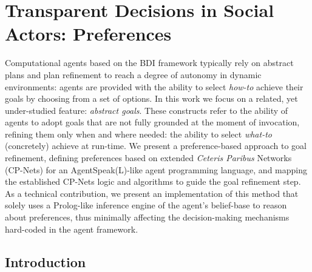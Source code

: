 \chapter{Transparent Decisions in Social Actors: Preferences}
\label{ch:preferences}
Computational agents based on the BDI framework typically rely on abstract plans and plan refinement to reach a degree of autonomy in dynamic environments: agents are provided with the 
ability to select \textit{how-to} achieve their goals by choosing from a set of options. In this work we focus on a related, yet under-studied feature: \textit{abstract goals}. These constructs refer to the ability of agents to adopt goals that are not fully grounded at the moment of invocation, refining them only when and where needed: the ability to select \textit{what-to} (concretely) achieve at run-time. We present a preference-based approach to goal refinement,  defining preferences based on extended \textit{Ceteris Paribus} Networks (CP-Nets) for an AgentSpeak(L)-like agent programming language, and mapping the established CP-Nets logic and algorithms to guide the goal refinement step. As a technical contribution, we present an implementation of this method that solely uses a Prolog-like inference engine of the agent's belief-base to reason about preferences, thus minimally affecting the decision-making mechanisms hard-coded in the agent framework.


\section{Introduction}


